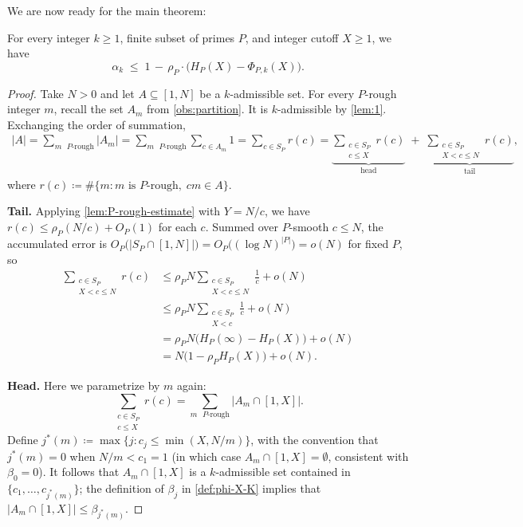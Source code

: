 \documentclass{amsart}
\begin{document}
We are now ready for the main theorem:
\begin{theorem}\label{thm:main}
   For every integer $k \geq 1$, finite subset of primes $P$, and integer cutoff $X \geq 1$, we have
   \[
      \alpha_k \;\leq\; 1 \,-\, \rho_P \cdot \bigl( H_P(X) - \Phi_{P,k}(X) \bigr).
   \]
\end{theorem}
\begin{proof}
Take $N > 0$ and let $A \subseteq [1, N]$ be a $k$-admissible set.
For every $P$-rough integer $m$, recall the set $A_m$ from \cref{obs:partition}. It is $k$-admissible by \cref{lem:1}.
Exchanging the order of summation,
\begin{equation}
   \begin{aligned}
      |A| = \sum_{m \text{ $P$-rough}} |A_m| = \sum_{m \text{ $P$-rough}} \sum_{c \in A_m} 1 = \sum_{c \in S_P} r(c) = \underbrace{\sum_{\substack{c \in S_P \\ c \leq X}} r(c)}_{\text{head}}
       \;+\; \underbrace{\sum_{\substack{c \in S_P \\ X < c \leq N}} r(c)}_{\text{tail}},
   \end{aligned}
\end{equation}
where $r(c) \coloneqq \# \{ m : m \text{ is $P$-rough}, \; cm \in A \}$.

\smallskip\noindent\textbf{Tail.} Applying \cref{lem:P-rough-estimate} with $Y = N/c$, we have $r(c) \leq \rho_P(N/c) + O_P(1)$ for each $c$. Summed over $P$-smooth $c \leq N$, the accumulated error is $O_P\bigl( |S_P \cap [1, N]| \bigr) = O_P\bigl( (\log N)^{|P|} \bigr) = o(N)$ for fixed $P$, so
\begin{equation}
\begin{aligned}
   \sum_{\substack{c \in S_P \\ X < c \leq N}} r(c) &\leq \rho_P N \sum_{\substack{c \in S_P \\ X < c \leq N}} \frac{1}{c} + o(N) \\
   &\leq \rho_P N \sum_{\substack{c \in S_P \\ X < c}} \frac{1}{c} + o(N) \\
   &= \rho_P N \big(H_P(\infty) - H_P(X)\big) + o(N) \\
   &= N \big(1 - \rho_P H_P(X)\big) + o(N).
\end{aligned}
\end{equation}

\smallskip\noindent\textbf{Head.} Here we parametrize by $m$ again:
\begin{equation}\label{eq:head}
\sum_{\substack{c \in S_P \\ c \leq X}} r(c) = \sum_{m \text{ $P$-rough}} |A_m \cap [1,X]|.
\end{equation}
Define $j^*(m) \coloneqq \max \{j \colon c_j \leq \min(X, N/m)\}$, with the convention that $j^*(m) = 0$ when $N/m < c_1 = 1$ (in which case $A_m \cap [1, X] = \emptyset$, consistent with $\beta_0 = 0$). It follows that $A_m \cap [1,X]$ is a $k$-admissible set contained in $\{c_1, \dots, c_{j^*(m)}\}$; the definition of $\beta_j$ in \cref{def:phi-X-K} implies that $|A_m \cap [1,X]| \leq \beta_{j^*(m)}$.


\end{proof}
\end{document}
